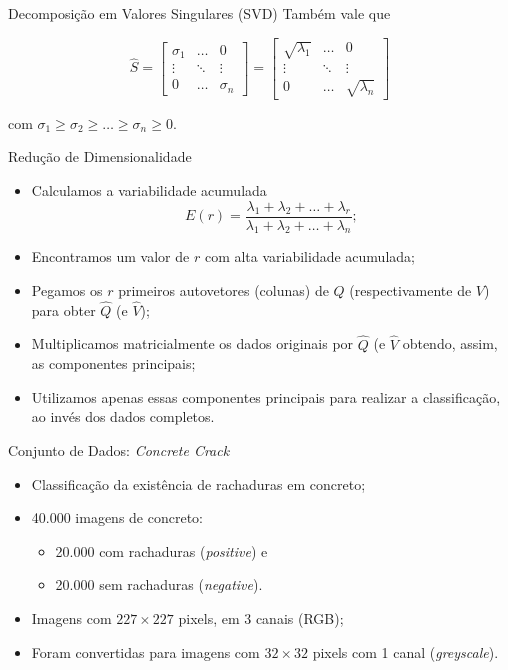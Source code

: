 \documentclass{beamer}
\theoremstyle{definition}
\begin{document}
\begin{frame}{Decomposição em Valores Singulares (SVD)}
    Também vale que

\begin{equation*}
\hat{S} = 
\begin{bmatrix}
    \sigma_1 & \dots & 0 \\
    \vdots & \ddots & \vdots \\
    0 & \dots & \sigma_n
\end{bmatrix}
=
\begin{bmatrix}
    \sqrt{\lambda_1} & \dots & 0 \\
    \vdots & \ddots & \vdots \\
    0 & \dots & \sqrt{\lambda_n}
\end{bmatrix}
\end{equation*}

com $\sigma_1 \geq \sigma_2 \geq \dots \geq \sigma_n \geq 0$.
\end{frame}

\begin{frame}{Redução de Dimensionalidade}
    \begin{itemize}
        \item Calculamos a variabilidade acumulada $$E(r) = \frac{\lambda_1 + \lambda_2 + \dots + \lambda_r}{\lambda_1 + \lambda_2 + \dots + \lambda_n};$$
        \pause
        \item Encontramos um valor de $r$ com alta variabilidade acumulada;
        \pause
        \item Pegamos os $r$ primeiros autovetores (colunas) de $Q$ (respectivamente de $V$) para obter $\hat{Q}$ (e $\hat{V}$);
        \pause
        \item Multiplicamos matricialmente os dados originais por $\hat{Q}$ (e $\hat{V}$ obtendo, assim, as componentes principais;
        \pause
        \item Utilizamos apenas essas componentes principais para realizar a classificação, ao invés dos dados completos.
    \end{itemize}
\end{frame}

\begin{frame}{Conjunto de Dados: \textit{Concrete Crack}}

\begin{itemize}
    \item Classificação da existência de rachaduras em concreto;
    \item 40.000 imagens de concreto:
    \begin{itemize}
        \item 20.000 com rachaduras (\textit{positive}) e
        \item 20.000 sem rachaduras (\textit{negative}).
    \end{itemize}
    \item Imagens com $227 \times 227$ pixels, em 3 canais (RGB);
    \item Foram convertidas para imagens com $32 \times 32$ pixels com 1 canal (\textit{greyscale}).
\end{itemize}
\end{frame}
\end{document}
